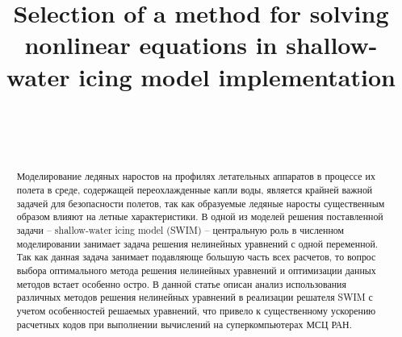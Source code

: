\documentclass[
11pt,%
tightenlines,%
twoside,%
onecolumn,%
nofloats,%
nobibnotes,%
nofootinbib,%
superscriptaddress,%
noshowpacs,%
centertags]%
{revtex4}
\begin{document}

\title{Selection of a method for solving nonlinear equations in shallow-water icing model implementation}

\author{~}

\author{~}



\begin{abstract}
Моделирование ледяных наростов на профилях летательных аппаратов в процессе их полета в среде, содержащей переохлажденные капли воды, является крайней важной задачей для безопасности полетов, так как образуемые ледяные наросты существенным образом влияют на летные характеристики.
В одной из моделей решения поставленной задачи -- shallow-water icing model (SWIM) -- центральную роль в численном моделировании занимает задача решения нелинейных уравнений с одной переменной.
Так как данная задача занимает подавляюще большую часть всех расчетов, то вопрос выбора оптимального метода решения нелинейных уравнений и оптимизации данных методов встает особенно остро.
В данной статье описан анализ использования различных методов решения нелинейных уравнений в реализации решателя SWIM с учетом особенностей решаемых уравнений, что привело к существенному ускорению расчетных кодов при выполнении вычислений на суперкомпьютерах МСЦ РАН.
\end{abstract}



\maketitle
\end{document}
